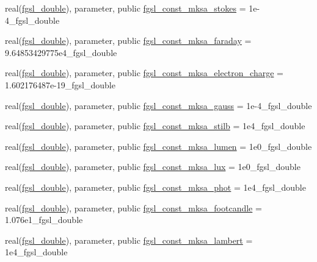\begin{DoxyCompactItemize}
\item 
real(\hyperlink{namespacefgsl_a9af5113378e0f000eb479d3f90196ddf}{fgsl\+\_\+double}), parameter, public \hyperlink{namespacefgsl_a273648685fb01a8fa87760688d2be8aa}{fgsl\+\_\+const\+\_\+mksa\+\_\+stokes} = 1e-\/4\+\_\+fgsl\+\_\+double
\item 
real(\hyperlink{namespacefgsl_a9af5113378e0f000eb479d3f90196ddf}{fgsl\+\_\+double}), parameter, public \hyperlink{namespacefgsl_a7a5c5ad37eb790e7372f127324e5fc9f}{fgsl\+\_\+const\+\_\+mksa\+\_\+faraday} = 9.\+64853429775e4\+\_\+fgsl\+\_\+double
\item 
real(\hyperlink{namespacefgsl_a9af5113378e0f000eb479d3f90196ddf}{fgsl\+\_\+double}), parameter, public \hyperlink{namespacefgsl_a5e5f274ebbe5764c7828f792b8b10b12}{fgsl\+\_\+const\+\_\+mksa\+\_\+electron\+\_\+charge} = 1.\+602176487e-\/19\+\_\+fgsl\+\_\+double
\item 
real(\hyperlink{namespacefgsl_a9af5113378e0f000eb479d3f90196ddf}{fgsl\+\_\+double}), parameter, public \hyperlink{namespacefgsl_a043539089f28355888955c6546349052}{fgsl\+\_\+const\+\_\+mksa\+\_\+gauss} = 1e-\/4\+\_\+fgsl\+\_\+double
\item 
real(\hyperlink{namespacefgsl_a9af5113378e0f000eb479d3f90196ddf}{fgsl\+\_\+double}), parameter, public \hyperlink{namespacefgsl_a744ee71f71c6df7add4526f13316e982}{fgsl\+\_\+const\+\_\+mksa\+\_\+stilb} = 1e4\+\_\+fgsl\+\_\+double
\item 
real(\hyperlink{namespacefgsl_a9af5113378e0f000eb479d3f90196ddf}{fgsl\+\_\+double}), parameter, public \hyperlink{namespacefgsl_a7bb4dd075b4ec4613ff976153a8a42dd}{fgsl\+\_\+const\+\_\+mksa\+\_\+lumen} = 1e0\+\_\+fgsl\+\_\+double
\item 
real(\hyperlink{namespacefgsl_a9af5113378e0f000eb479d3f90196ddf}{fgsl\+\_\+double}), parameter, public \hyperlink{namespacefgsl_a38e1e1db82aff58851133f55d981feed}{fgsl\+\_\+const\+\_\+mksa\+\_\+lux} = 1e0\+\_\+fgsl\+\_\+double
\item 
real(\hyperlink{namespacefgsl_a9af5113378e0f000eb479d3f90196ddf}{fgsl\+\_\+double}), parameter, public \hyperlink{namespacefgsl_aa7384fc174d5954073075ac6e8117789}{fgsl\+\_\+const\+\_\+mksa\+\_\+phot} = 1e4\+\_\+fgsl\+\_\+double
\item 
real(\hyperlink{namespacefgsl_a9af5113378e0f000eb479d3f90196ddf}{fgsl\+\_\+double}), parameter, public \hyperlink{namespacefgsl_aed42c585eae8fbc1ddd6baf9d539408f}{fgsl\+\_\+const\+\_\+mksa\+\_\+footcandle} = 1.\+076e1\+\_\+fgsl\+\_\+double
\item 
real(\hyperlink{namespacefgsl_a9af5113378e0f000eb479d3f90196ddf}{fgsl\+\_\+double}), parameter, public \hyperlink{namespacefgsl_abb530767690eea1cf7e8d6d99141ae41}{fgsl\+\_\+const\+\_\+mksa\+\_\+lambert} = 1e4\+\_\+fgsl\+\_\+double

\end{DoxyCompactItemize}
